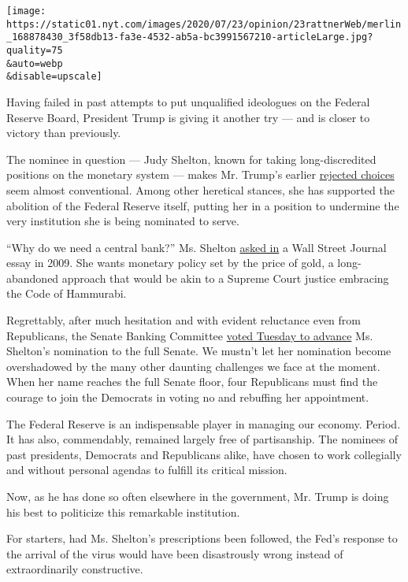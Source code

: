 \texttt{[image: https://static01.nyt.com/images/2020/07/23/opinion/23rattnerWeb/merlin\_168878430\_3f58db13-fa3e-4532-ab5a-bc3991567210-articleLarge.jpg?quality=75\\\&auto=webp\\\&disable=upscale]}

Having failed in past attempts to put unqualified ideologues on the
Federal Reserve Board, President Trump is giving it another try --- and
is closer to victory than previously.

The nominee in question --- Judy Shelton, known for taking
long-discredited positions on the monetary system --- makes Mr. Trump's
earlier
\href{https://www.nytimes.com/2019/05/02/business/stephen-moore-fed.html}{rejected
choices} seem almost conventional. Among other heretical stances, she
has supported the abolition of the Federal Reserve itself, putting her
in a position to undermine the very institution she is being nominated
to serve.

``Why do we need a central bank?'' Ms. Shelton
\href{https://www.wsj.com/articles/SB123811225716453243}{asked in} a
Wall Street Journal essay in 2009. She wants monetary policy set by the
price of gold, a long-abandoned approach that would be akin to a Supreme
Court justice embracing the Code of Hammurabi.

Regrettably, after much hesitation and with evident reluctance even from
Republicans, the Senate Banking Committee
\href{https://www.nytimes.com/2020/07/21/business/economy/shelton-federal-reserve-trump-senate.html}{voted
Tuesday to advance} Ms. Shelton's nomination to the full Senate. We
mustn't let her nomination become overshadowed by the many other
daunting challenges we face at the moment. When her name reaches the
full Senate floor, four Republicans must find the courage to join the
Democrats in voting no and rebuffing her appointment.

The Federal Reserve is an indispensable player in managing our economy.
Period. It has also, commendably, remained largely free of partisanship.
The nominees of past presidents, Democrats and Republicans alike, have
chosen to work collegially and without personal agendas to fulfill its
critical mission.

Now, as he has done so often elsewhere in the government, Mr. Trump is
doing his best to politicize this remarkable institution.

For starters, had Ms. Shelton's prescriptions been followed, the Fed's
response to the arrival of the virus would have been disastrously wrong
instead of extraordinarily constructive.

